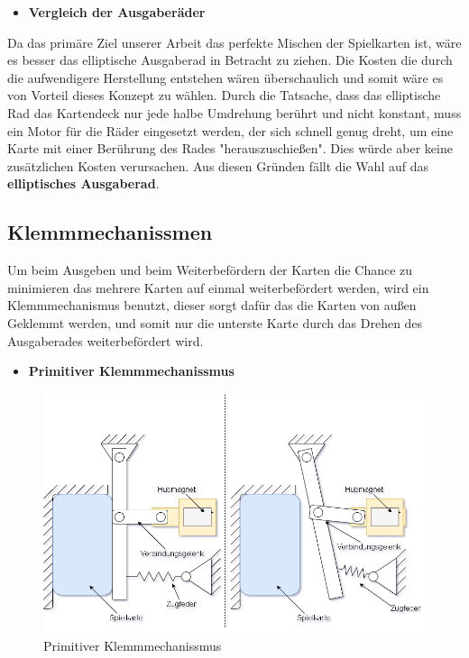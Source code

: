 \begin{itemize}
    \item \textbf{Vergleich der Ausgaberäder}
\end{itemize}

Da das primäre Ziel unserer Arbeit das perfekte Mischen der Spielkarten ist, wäre es besser das elliptische Ausgaberad in Betracht zu ziehen. Die Kosten
die durch die aufwendigere Herstellung entstehen wären überschaulich und somit wäre es von Vorteil dieses Konzept zu wählen. Durch die Tatsache, dass das elliptische Rad
das Kartendeck nur jede halbe Umdrehung berührt und nicht konstant, muss ein Motor für die Räder eingesetzt werden, der sich schnell genug dreht, um eine Karte mit einer Berührung
des Rades "herauszuschießen". Dies würde aber keine zusätzlichen Kosten verursachen. Aus diesen Gründen fällt die Wahl auf das \textbf{elliptisches Ausgaberad}. \\

\subsection{Klemmmechanissmen}
Um beim Ausgeben und beim Weiterbefördern der Karten die Chance zu minimieren das mehrere Karten auf einmal weiterbefördert werden, wird ein
Klemmmechanismus benutzt, dieser sorgt dafür das die Karten von außen Geklemmt werden, und somit nur die unterste Karte durch das Drehen des
Ausgaberades weiterbefördert wird.

\begin{itemize}
    \item \textbf{Primitiver Klemmmechanissmus}
\end{itemize}

\begin{figure}[H]
    \centering
    \includegraphics[scale=0.5,page=1]{fig/mech/Kartenausgabe_1}
    \caption{Primitiver Klemmmechanissmus}
\end{figure}

